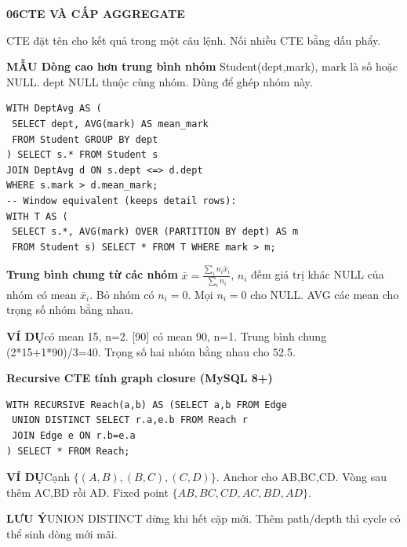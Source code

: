\documentclass[a4paper]{article}
\newcommand{\sqlfont}{\ttfamily}
\newcommand{\bodyfontsize}{5.55}
\newcommand{\bodyleading}{5.2}
\newcommand{\bodylineskiplimit}{-2pt}
\newcommand{\bodystyle}{%
  \fontsize{\bodyfontsize}{\bodyleading}\selectfont\setlength{\lineskiplimit}{\bodylineskiplimit}\RaggedRight
  \setlength{\abovedisplayskip}{.5pt}\setlength{\belowdisplayskip}{.5pt}%
  \setlength{\abovedisplayshortskip}{.3pt}\setlength{\belowdisplayshortskip}{.3pt}}
\newcommand{\topic}[2]{\par\addvspace{.45pt}\nointerlineskip%
  \begingroup\setlength{\fboxsep}{0.35pt}%
  \noindent\colorbox{structure}{\parbox{\dimexpr\linewidth-2\fboxsep\relax}{%
    \color{white}\fontsize{6.45}{6.8}\selectfont\bfseries #1\enspace #2}}%
  \endgroup\par\nobreak\vspace{.55pt}\nointerlineskip\nobreak}
\newenvironment{topicblock}
  {\par\bodystyle}
  {\par}
\newcommand{\key}[1]{\par\textcolor{structure}{\textbf{#1}}\enspace}
\newcommand{\note}[4]{\par\nointerlineskip\vspace{.25pt}\begingroup\setlength{\fboxsep}{0.1pt}%
  \noindent\colorbox{#1}{\parbox{\dimexpr\linewidth-2\fboxsep\relax}{%
    \RaggedRight\textcolor{#2}{\textbf{#3}}\enspace #4}}%
  \endgroup\par\nointerlineskip\vspace{.25pt}}
\newcommand{\trap}[1]{\note{warningbg}{warning}{LƯU Ý}{#1}}
\newcommand{\ex}[1]{\note{examplebg}{example}{VÍ DỤ}{#1}}
\newcommand{\pattern}[1]{\key{MẪU #1}}
\newcommand{\sql}[1]{{\sqlfont\color{sqltext}\detokenize{#1}}}
\newlength{\sheetwidth}
\newenvironment{sheetcolumns}[1]
  {\noindent\begin{minipage}[t]{#1\sheetwidth}\vspace{0pt}\bodystyle\ignorespaces}
  {\end{minipage}\par}
\begin{document}
\begin{sheetcolumns}{.258}
\begin{topicblock}
\topic{06}{CTE VÀ CẤP AGGREGATE}
CTE đặt tên cho kết quả trong một câu lệnh. Nối nhiều CTE bằng dấu phẩy.
\pattern{Dòng cao hơn trung bình nhóm}
Student(dept,mark), mark là số hoặc NULL. dept NULL thuộc cùng nhóm. Dùng \sql{<=>} để ghép nhóm này.
\begin{lstlisting}
WITH DeptAvg AS (
 SELECT dept, AVG(mark) AS mean_mark
 FROM Student GROUP BY dept
) SELECT s.* FROM Student s
JOIN DeptAvg d ON s.dept <=> d.dept
WHERE s.mark > d.mean_mark;
-- Window equivalent (keeps detail rows):
WITH T AS (
 SELECT s.*, AVG(mark) OVER (PARTITION BY dept) AS m
 FROM Student s) SELECT * FROM T WHERE mark > m;
\end{lstlisting}
\key{Trung bình chung từ các nhóm}
$\bar{x}=\frac{\sum_i n_i\bar{x}_i}{\sum_i n_i}$, $n_i$ đếm giá trị khác NULL của nhóm có mean $\bar{x}_i$. Bỏ nhóm có $n_i=0$. Mọi $n_i=0$ cho NULL. AVG các mean cho trọng số nhóm bằng nhau.
\ex{[10,20] có mean 15, n=2. [90] có mean 90, n=1. Trung bình chung (2*15+1*90)/3=40. Trọng số hai nhóm bằng nhau cho 52.5.}
\key{Recursive CTE tính graph closure (MySQL 8+)}
\begin{lstlisting}
WITH RECURSIVE Reach(a,b) AS (SELECT a,b FROM Edge
 UNION DISTINCT SELECT r.a,e.b FROM Reach r
 JOIN Edge e ON r.b=e.a
) SELECT * FROM Reach;
\end{lstlisting}
\ex{Cạnh $\{(A,B),(B,C),(C,D)\}$. Anchor cho AB,BC,CD. Vòng sau thêm AC,BD rồi AD. Fixed point $\{AB,BC,CD,AC,BD,AD\}$.}
\trap{UNION DISTINCT dừng khi hết cặp mới. Thêm path/depth thì cycle có thể sinh dòng mới mãi.}
\end{topicblock}


\end{sheetcolumns}
\end{document}
